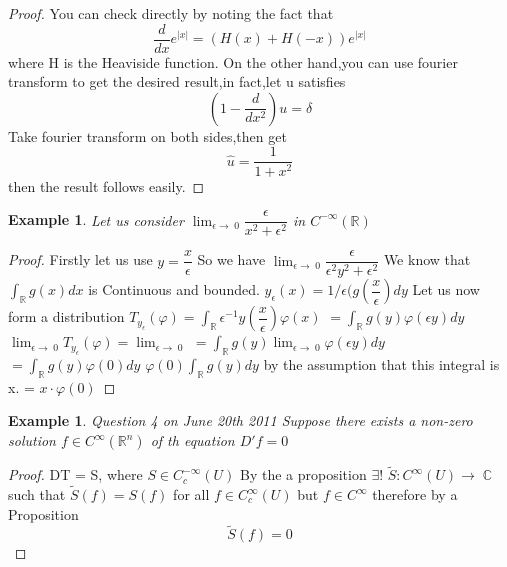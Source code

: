 \documentclass[12pt, oneside, a4paper]{article}
\theoremstyle{dfn}
\newtheorem{ex}[thm]{Example}
\def\Rbb{\ensuremath{\mathbb{R}}}
\newcommand{\To}{\ensuremath{\rightarrow \;}}
\renewcommand{\phi}{\varphi}
\newcommand{\Com}{\mathbb{C}}
\begin{document}
\begin{proof}
 You can check directly by noting the fact that 
$$
\frac{d}{dx}e^{|x|}=(H(x)+H(-x))e^{|x|}
$$
where H is the Heaviside function.
On the other hand,you can use fourier transform to get the desired result,in fact,let u satisfies
$$
(1-\frac{d}{dx^2})u=\delta
$$
Take fourier transform on both sides,then get 
$$
\widehat{u}=\frac{1}{1+x^2}
$$
then the result follows easily.
\end{proof}
\begin{ex}
 Let us consider 
$ \lim_{\epsilon \To 0} \dfrac{\epsilon}{x^{2} + \epsilon^{2}} $ in $C^{-\infty}(\Rbb)$
\end{ex}
\begin{proof}
 Firstly let us use $y = \dfrac{x}{\epsilon}$\newline
So we have $\lim_{\epsilon \To 0} \dfrac{\epsilon}{\epsilon^{2} y^{2} + \epsilon^{2}}$\newline
We know that $\int_\Rbb g(x)dx$ is Continuous and bounded.\newline
$y_{\epsilon}(x) = 1/\epsilon(g(\dfrac{x}{\epsilon})dy$ \newline
Let us now form a distribution \newline
$T_{y_{\epsilon}}(\phi) = \int_{\Rbb} \epsilon^{-1} y(\dfrac{x}{\epsilon}) \phi(x)$\newline
$= \int_\Rbb g(y) \phi(\epsilon y) dy$
$\lim_{\epsilon \To 0} T_{y_{\epsilon}}(\phi) = \lim_{\epsilon \To 0}$\newline
$= \int_\Rbb g(y) \lim_{\epsilon \To 0} \phi(\epsilon y) dy$ \newline
$= \int_\Rbb g(y) \phi(0) dy$ \newline
$\phi(0) \int_\Rbb g(y) dy$ by the assumption that this integral is x. \newline
= $x\cdot \phi(0)$
\end{proof}
\begin{ex}
 Question 4 on June 20th 2011
Suppose there exists a non-zero solution $f \in C^{\infty}(\Rbb^{n})$ of th equation 
$D' f = 0$ 
\end{ex}
\begin{proof}
 DT = S, where $S \in C^{-\infty}_{c}(U)$
By the a proposition $\exists$! $\tilde{S}:C^{\infty}(U) \To \Com$
such that 
$\tilde{S}(f) = S(f)$ for all $f \in C^{\infty}_{c}(U)$
but $f \in C^{\infty}$ therefore by a Proposition \begin{equation}\tilde{S}(f) = 0 \end{equation}
\end{proof}
\end{document}

